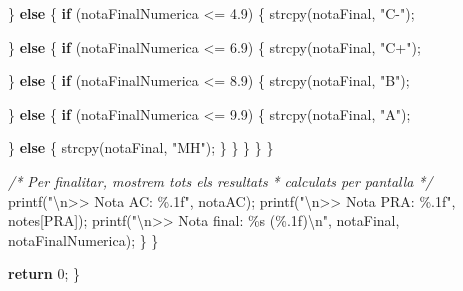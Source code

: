 \documentclass[
]{book}
\newenvironment{Shaded}{\begin{snugshade}}{\end{snugshade}}
\newcommand{\CommentTok}[1]{\textcolor[rgb]{0.56,0.35,0.01}{\textit{#1}}}
\newcommand{\ControlFlowTok}[1]{\textcolor[rgb]{0.13,0.29,0.53}{\textbf{#1}}}
\newcommand{\DecValTok}[1]{\textcolor[rgb]{0.00,0.00,0.81}{#1}}
\newcommand{\FloatTok}[1]{\textcolor[rgb]{0.00,0.00,0.81}{#1}}
\newcommand{\NormalTok}[1]{#1}
\newcommand{\SpecialCharTok}[1]{\textcolor[rgb]{0.00,0.00,0.00}{#1}}
\newcommand{\StringTok}[1]{\textcolor[rgb]{0.31,0.60,0.02}{#1}}
\begin{document}
\begin{Shaded}
\begin{Highlighting}[]
\NormalTok{            \} }\ControlFlowTok{else}\NormalTok{ \{}
                \ControlFlowTok{if}\NormalTok{ (notaFinalNumerica \textless{}= }\FloatTok{4.9}\NormalTok{) \{}
\NormalTok{                    strcpy(notaFinal, }\StringTok{"C{-}"}\NormalTok{);}

\NormalTok{                \} }\ControlFlowTok{else}\NormalTok{ \{}
                    \ControlFlowTok{if}\NormalTok{ (notaFinalNumerica \textless{}= }\FloatTok{6.9}\NormalTok{) \{}
\NormalTok{                        strcpy(notaFinal, }\StringTok{"C+"}\NormalTok{);}

\NormalTok{                    \} }\ControlFlowTok{else}\NormalTok{ \{}
                        \ControlFlowTok{if}\NormalTok{ (notaFinalNumerica \textless{}= }\FloatTok{8.9}\NormalTok{) \{}
\NormalTok{                            strcpy(notaFinal, }\StringTok{"B"}\NormalTok{);}

\NormalTok{                        \} }\ControlFlowTok{else}\NormalTok{ \{}
                            \ControlFlowTok{if}\NormalTok{ (notaFinalNumerica \textless{}= }\FloatTok{9.9}\NormalTok{) \{}
\NormalTok{                                strcpy(notaFinal, }\StringTok{"A"}\NormalTok{);}

\NormalTok{                            \} }\ControlFlowTok{else}\NormalTok{ \{}
\NormalTok{                                strcpy(notaFinal, }\StringTok{"MH"}\NormalTok{);}
\NormalTok{                            \}}
\NormalTok{                        \}}
\NormalTok{                    \}}
\NormalTok{                \}}
\NormalTok{            \}}

            \CommentTok{/* Per finalitar, mostrem tots els resultats}
\CommentTok{             * calculats per pantalla}
\CommentTok{             */}
\NormalTok{            printf(}\StringTok{"}\SpecialCharTok{\textbackslash{}n}\StringTok{\textgreater{}\textgreater{} Nota AC: \%.1f"}\NormalTok{, notaAC);}
\NormalTok{            printf(}\StringTok{"}\SpecialCharTok{\textbackslash{}n}\StringTok{\textgreater{}\textgreater{} Nota PRA: \%.1f"}\NormalTok{, notes[PRA]);}
\NormalTok{            printf(}\StringTok{"}\SpecialCharTok{\textbackslash{}n}\StringTok{\textgreater{}\textgreater{} Nota final: \%s (\%.1f)}\SpecialCharTok{\textbackslash{}n}\StringTok{"}\NormalTok{, notaFinal, notaFinalNumerica);}
\NormalTok{        \}}
\NormalTok{    \}}

    \ControlFlowTok{return} \DecValTok{0}\NormalTok{;}
\NormalTok{\}}
\end{Highlighting}
\end{Shaded}
\end{document}

